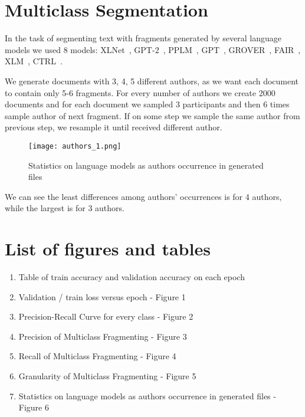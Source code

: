 \documentclass{article}
\begin{document}
\clearpage



\newpage
\appendix
\section{Multiclass Segmentation}

In the task of segmenting text with fragments generated by several language models we used 8 models: XLNet~\cite{xlnet}, GPT-2~\cite{gpt2}, PPLM~\cite{pplm}, GPT~\cite{gpt}, GROVER~\cite{grover}, FAIR~\cite{FAIR}, XLM~\cite{xlm}, CTRL~\cite{ctrl}.

We generate  documents with 3, 4, 5 different authors, as we want each document to contain only 5-6 fragments. For every number of authors we create 2000 documents and for each document we sampled 3 participants and then 6 times sample author of next fragment. If on some step we sample the same author from previous step, we resample it until received different author. 

\begin{figure}[bhtp]
	\texttt{[image: authors\_1.png]}
	\caption{Statistics on language models as authors occurrence in generated files}
	\label{fig:6}
\end{figure}

We can see the least differences among authors' occurrences is for 4 authors, while the largest is for 3 authors.

\section{List of figures and tables}
\begin{enumerate}
    \item Table of train accuracy and validation accuracy on each epoch
    \item Validation / train loss versus epoch - Figure 1
    \item Precision-Recall Curve for every class - Figure 2
    \item Precision of Multiclass Fragmenting - Figure 3
    \item Recall of Multiclass Fragmenting - Figure 4
    \item Granularity of Multiclass Fragmenting - Figure 5
    \item Statistics on language models as authors occurrence in generated files - Figure 6
    
\end{enumerate}
\end{document}
